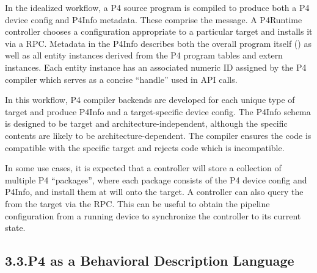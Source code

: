 \documentclass[11pt]{article}
\begin{document}
{%
\noindent{}In the idealized workflow, a P4 source program is compiled to produce both a P4
device config and P4Info metadata. These comprise the 
message. A P4Runtime controller chooses a configuration appropriate to a
particular target and installs it via a 
RPC. Metadata in the P4Info describes both the overall program itself
() as well as all entity instances derived from the P4 program \textemdash{}
tables and extern instances. Each entity instance has an associated numeric ID
assigned by the P4 compiler which serves as a concise \textquotedblleft{}handle\textquotedblright{} used in API
calls.%

In this workflow, P4 compiler backends are developed for each unique type of
target and produce P4Info and a target-specific device config. The P4Info schema
is designed to be target and architecture-independent, although the specific
contents are likely to be architecture-dependent. The compiler ensures the code
is compatible with the specific target and rejects code which is incompatible.%

In some use cases, it is expected that a controller will store a
collection of multiple P4 \textquotedblleft{}packages\textquotedblright{}, where each package consists of
the P4 device config and P4Info, and install them at will onto the target. A
controller can also query the  from the target via the
 RPC. This can be useful to obtain the pipeline
configuration from a running device to synchronize the controller to its current
state.%

\subsection{3.3.\hspace*{0.5em}P4 as a Behavioral Description Language}\label{sec-p4-as-behavioral-description-language}%

}
\end{document}
